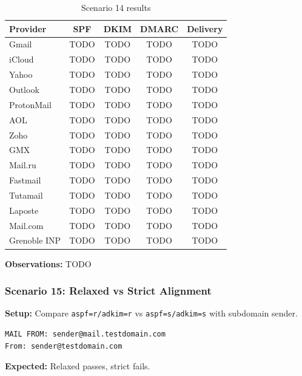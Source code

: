\documentclass[11pt,a4paper]{article}
\begin{document}
\begin{table}[h]
\centering
\small
\begin{tabular}{lcccc}
\toprule
\textbf{Provider} & \textbf{SPF} & \textbf{DKIM} & \textbf{DMARC} & \textbf{Delivery} \\
\midrule
Gmail & TODO & TODO & TODO & TODO \\
iCloud & TODO & TODO & TODO & TODO \\
Yahoo & TODO & TODO & TODO & TODO \\
Outlook & TODO & TODO & TODO & TODO \\
ProtonMail & TODO & TODO & TODO & TODO \\
AOL & TODO & TODO & TODO & TODO \\
Zoho & TODO & TODO & TODO & TODO \\
GMX & TODO & TODO & TODO & TODO \\
Mail.ru & TODO & TODO & TODO & TODO \\
Fastmail & TODO & TODO & TODO & TODO \\
Tutamail & TODO & TODO & TODO & TODO \\
Laposte & TODO & TODO & TODO & TODO \\
Mail.com & TODO & TODO & TODO & TODO \\
Grenoble INP & TODO & TODO & TODO & TODO \\
\bottomrule
\end{tabular}
\caption{Scenario 14 results}
\end{table}

\textbf{Observations:} TODO


\subsubsection{Scenario 15: Relaxed vs Strict Alignment}

\textbf{Setup:} Compare \texttt{aspf=r/adkim=r} vs \texttt{aspf=s/adkim=s} with subdomain sender.

\begin{lstlisting}
MAIL FROM: sender@mail.testdomain.com
From: sender@testdomain.com
\end{lstlisting}

\textbf{Expected:} Relaxed passes, strict fails.
\end{document}
